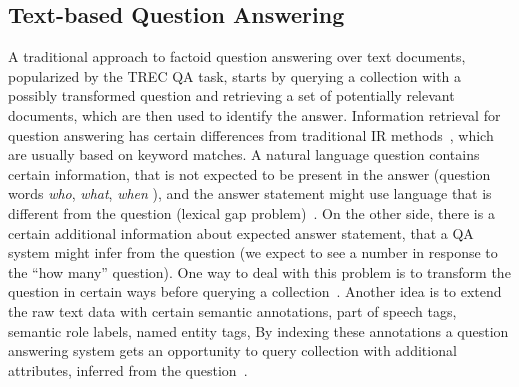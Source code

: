 \subsection{Text-based Question Answering}
\label{section:relatedwork:factoid:text}

A traditional approach to factoid question answering over text documents, popularized by the TREC QA task, starts by querying a collection with a possibly transformed question and retrieving a set of potentially relevant documents, which are then used to identify the answer.
Information retrieval for question answering has certain differences from traditional IR methods~\cite{keikha2014retrieving}, which are usually based on keyword matches.
A natural language question contains certain information, that is not expected to be present in the answer (\eg question words \textit{who}, \textit{what}, \textit{when} \etc), and the answer statement might use language that is different from the question (lexical gap problem)~\cite{berger2000bridging}.
On the other side, there is a certain additional information about expected answer statement, that a QA system might infer from the question (\eg we expect to see a number in response to the ``how many'' question).
One way to deal with this problem is to transform the question in certain ways before querying a collection~\cite{AgichteinLG01,brill_askmsr}.
Another idea is to extend the raw text data with certain semantic annotations, \eg part of speech tags, semantic role labels, named entity tags, \etc
By indexing these annotations a question answering system gets an opportunity to query collection with additional attributes, inferred from the question~\cite{bilotti2007structured,yao2013automatic,chen2016discriminative}.

